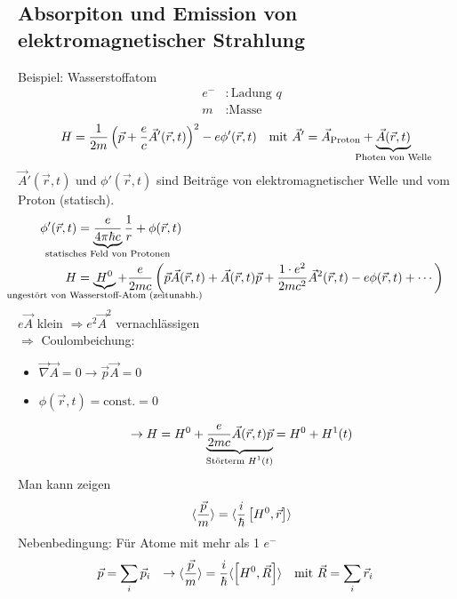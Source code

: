 \subsection{Absorpiton und Emission von elektromagnetischer Strahlung}
	Beispiel: Wasserstoffatom
		\begin{align*}
		e^- &: \text{Ladung~} q \\
		m &: \text{Masse}
		\end{align*}
		\begin{align*}
			H &= \frac{1}{2m} \left( \vec{p} + \frac{e}{c} \vec{A}' (\vec{r} , t)\right)^2
			- e \phi' (\vec{r} , t) 
			&\text{mit~} \vec{A}' &= \vec{A}_{\text{Proton}} + \underbrace{\vec{A} (\vec{r} , t)}_{\mathclap{\text{Photen von Welle}}}		
		\end{align*}
	$\vec{A}' (\vec{r} , t)$ und $\phi' (\vec{r} , t)$ sind Beiträge von elektromagnetischer Welle und vom Proton (statisch). 
		\begin{align*}
			\phi' (\vec{r} , t) &= \underbrace{\frac{e}{4 \pi \hbar c}}_{\mathclap{\text{statisches Feld von Protonen}}}
			\frac{1}{r} + \phi (\vec{r} , t) \\
			H &= \underbrace{H^0}_{\mathclap{\text{ungestört von Wasserstoff-Atom (zeitunabh.)}}}
			+ \frac{e}{2 m c} \left( \vec{p} \vec{A} (\vec{r} , t) + \vec{A} (\vec{r} , t) \vec{p} + \frac{1 \cdot e^2}{2 m c^2} \vec{A}^2 (\vec{r} , t) - e\phi (\vec{r} , t) + \cdots 
			\right)
		\end{align*} 
	$e \vec{A}$ klein $\Rightarrow e^2 \vec{A}^2$ vernachlässigen \\
	$\Rightarrow$ Coulombeichung:
		\begin{itemize}
			\item $\vec{\nabla} \vec{A} = 0 \rightarrow \vec{p} \vec{A} = 0$ 
			\item $\phi (\vec{r}, t) = \text{const.} = 0$
		\end{itemize}
		\begin{equation*}
			\rightarrow H = H^0 +
			\underbrace{\frac{e}{2 m c} \vec{A} (\vec{r} , t) \vec{p}}_{\mathclap{\text{Störterm~} H^1(t)}} 
			= H^0 + H^1(t)
		\end{equation*}
	Man kann zeigen 
		\begin{equation*}
			\langle {\frac{\vec{p}}{m}} \rangle = \langle {\frac{i}{\hbar} \left[H^0 , \vec{r}\right]} \rangle
		\end{equation*}
	Nebenbedingung: Für Atome mit mehr als 1 $e^-$
		\begin{align*}
			\vec{p} &= \sum_i \vec{p}_i 
			&\rightarrow \langle {\frac{\vec{p}}{m}} \rangle &= \frac{i}{\hbar} \langle {\left[H^0 , \vec{R}\right]} \rangle
			&\text{mit~} \vec{R} &= \sum_i \vec{r}_i
		\end{align*}
